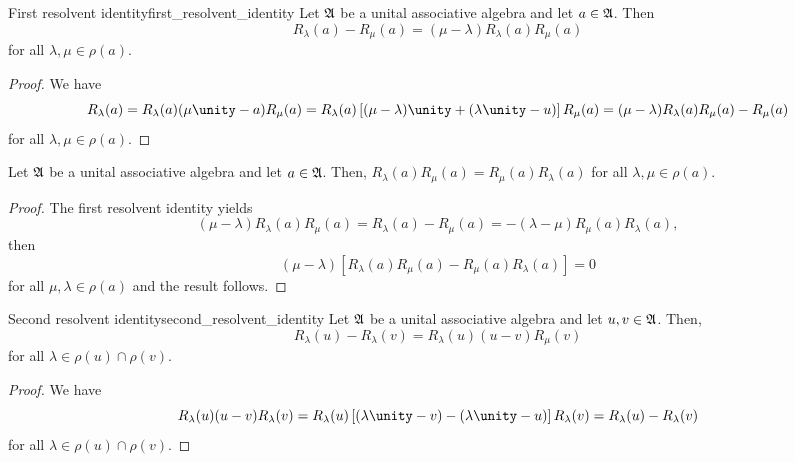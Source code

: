 \begin{proposition}{First resolvent identity}{first_resolvent_identity}
    Let \(\mathfrak{A}\) be a unital associative algebra and let \(a \in \mathfrak{A}\). Then
    \begin{equation*}
        R_{\lambda}(a) - R_{\mu}(a) = (\mu - \lambda)R_{\lambda}(a)R_{\mu}(a)
    \end{equation*}
    for all \(\lambda, \mu \in \rho(a)\).
\end{proposition}
\begin{proof}
    We have
    \begin{equation*}
        R_{\lambda}(a) = R_{\lambda}(a)(\mu \unity - a)R_{\mu}(a) = R_{\lambda}(a) \left[(\mu - \lambda)\unity + (\lambda \unity - u)\right]R_{\mu}(a) = (\mu - \lambda)R_{\lambda}(a) R_{\mu}(a) - R_{\mu}(a)
    \end{equation*}
    for all \(\lambda, \mu \in \rho(a)\).
\end{proof}
\begin{corollary}
    Let \(\mathfrak{A}\) be a unital associative algebra and let \(a \in \mathfrak{A}\). Then, \(R_{\lambda}(a)R_{\mu}(a) = R_{\mu}(a)R_{\lambda}(a)\) for all \(\lambda, \mu \in \rho(a)\).
\end{corollary}
\begin{proof}
    The first resolvent identity yields
    \begin{equation*}
        (\mu - \lambda)R_{\lambda}(a)R_{\mu}(a) = R_{\lambda}(a) - R_{\mu}(a) = -(\lambda - \mu)R_{\mu}(a)R_{\lambda}(a),
    \end{equation*}
    then
    \begin{equation*}
        (\mu - \lambda)\left[R_{\lambda}(a) R_{\mu}(a) - R_{\mu}(a) R_{\lambda}(a)\right] = 0
    \end{equation*}
    for all \(\mu,\lambda \in \rho(a)\) and the result follows.
\end{proof}
\begin{proposition}{Second resolvent identity}{second_resolvent_identity}
    Let \(\mathfrak{A}\) be a unital associative algebra and let \(u, v \in \mathfrak{A}\). Then,
    \begin{equation*}
        R_{\lambda}(u) - R_{\lambda}(v) = R_{\lambda}(u) (u - v) R_{\mu}(v)
    \end{equation*}
    for all \(\lambda \in \rho(u) \cap \rho(v)\).
\end{proposition}
\begin{proof}
    We have
    \begin{equation*}
        R_{\lambda}(u) (u-v) R_{\lambda}(v) = R_{\lambda}(u) \left[(\lambda \unity - v) - (\lambda \unity - u)\right] R_{\lambda}(v) = R_{\lambda}(u) - R_{\lambda}(v)
    \end{equation*}
    for all \(\lambda \in \rho(u) \cap \rho(v)\).
\end{proof}
